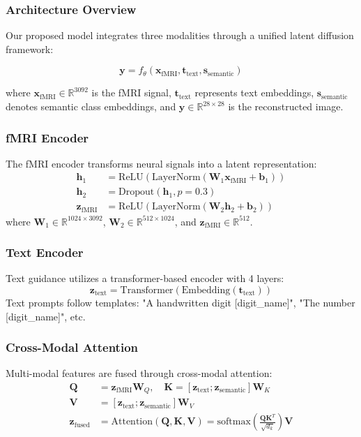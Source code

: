 \subsubsection{Architecture Overview}
Our proposed model integrates three modalities through a unified latent diffusion framework:

\begin{equation}
\mathbf{y} = f_{\theta}(\mathbf{x}_{\text{fMRI}}, \mathbf{t}_{\text{text}}, \mathbf{s}_{\text{semantic}})
\end{equation}

where $\mathbf{x}_{\text{fMRI}} \in \mathbb{R}^{3092}$ is the fMRI signal, $\mathbf{t}_{\text{text}}$ represents text embeddings, $\mathbf{s}_{\text{semantic}}$ denotes semantic class embeddings, and $\mathbf{y} \in \mathbb{R}^{28 \times 28}$ is the reconstructed image.

\subsubsection{fMRI Encoder}
The fMRI encoder transforms neural signals into a latent representation:
\begin{align}
\mathbf{h}_1 &= \text{ReLU}(\text{LayerNorm}(\mathbf{W}_1 \mathbf{x}_{\text{fMRI}} + \mathbf{b}_1)) \\
\mathbf{h}_2 &= \text{Dropout}(\mathbf{h}_1, p=0.3) \\
\mathbf{z}_{\text{fMRI}} &= \text{ReLU}(\text{LayerNorm}(\mathbf{W}_2 \mathbf{h}_2 + \mathbf{b}_2))
\end{align}
where $\mathbf{W}_1 \in \mathbb{R}^{1024 \times 3092}$, $\mathbf{W}_2 \in \mathbb{R}^{512 \times 1024}$, and $\mathbf{z}_{\text{fMRI}} \in \mathbb{R}^{512}$.

\subsubsection{Text Encoder}
Text guidance utilizes a transformer-based encoder with 4 layers:
\begin{equation}
\mathbf{z}_{\text{text}} = \text{Transformer}(\text{Embedding}(\mathbf{t}_{\text{text}}))
\end{equation}
Text prompts follow templates: "A handwritten digit [digit\_name]", "The number [digit\_name]", etc.

\subsubsection{Cross-Modal Attention}
Multi-modal features are fused through cross-modal attention:
\begin{align}
\mathbf{Q} &= \mathbf{z}_{\text{fMRI}} \mathbf{W}_Q, \quad \mathbf{K} = [\mathbf{z}_{\text{text}}; \mathbf{z}_{\text{semantic}}] \mathbf{W}_K \\
\mathbf{V} &= [\mathbf{z}_{\text{text}}; \mathbf{z}_{\text{semantic}}] \mathbf{W}_V \\
\mathbf{z}_{\text{fused}} &= \text{Attention}(\mathbf{Q}, \mathbf{K}, \mathbf{V}) = \text{softmax}\left(\frac{\mathbf{Q}\mathbf{K}^T}{\sqrt{d_k}}\right)\mathbf{V}
\end{align}


